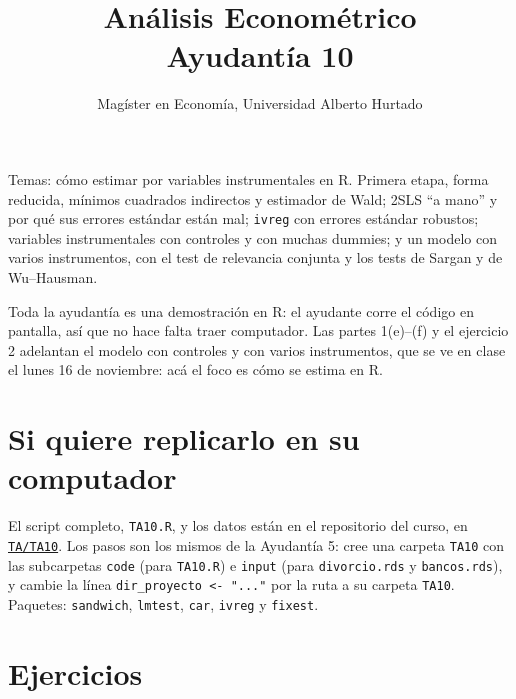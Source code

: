 \documentclass[letterpaper,11pt]{article}
\title{Análisis Econométrico \\ Ayudantía 10}
\author{Magíster en Economía, Universidad Alberto Hurtado}
\date{}
\begin{document}
\maketitle

\noindent Temas: cómo estimar por variables instrumentales en R. Primera etapa, forma
reducida, mínimos cuadrados indirectos y estimador de Wald; 2SLS ``a mano'' y por qué sus
errores estándar están mal; \texttt{ivreg} con errores estándar robustos; variables
instrumentales con controles y con muchas dummies; y un modelo con varios instrumentos, con
el test de relevancia conjunta y los tests de Sargan y de Wu--Hausman.

\medskip
\noindent Toda la ayudantía es una demostración en R: el ayudante corre el código en
pantalla, así que no hace falta traer computador. Las partes 1(e)--(f) y el ejercicio 2
adelantan el modelo con controles y con varios instrumentos, que se ve en clase el lunes 16
de noviembre: acá el foco es cómo se estima en R.

\section*{Si quiere replicarlo en su computador}

\noindent El script completo, \texttt{TA10.R}, y los datos están en el repositorio del curso,
en \href{https://github.com/ramirode/econometria_mae/tree/main/TA/TA10}{\texttt{TA/TA10}}. Los
pasos son los mismos de la Ayudantía 5: cree una carpeta \texttt{TA10} con las subcarpetas
\texttt{code} (para \texttt{TA10.R}) e \texttt{input} (para \texttt{divorcio.rds} y
\texttt{bancos.rds}), y cambie la línea \texttt{dir\_proyecto <- "..."} por la ruta a su
carpeta \texttt{TA10}. Paquetes: \texttt{sandwich}, \texttt{lmtest}, \texttt{car},
\texttt{ivreg} y \texttt{fixest}.

\section*{Ejercicios}
\end{document}
